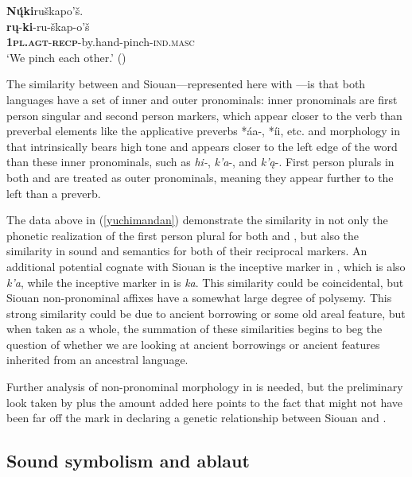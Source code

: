\documentclass[output=paper]{LSP/langsci}
\begin{document}
	\ex  
	\glll \textbf{N\k{\'u}ki}ru\v{s}kapo'\v{s}. \\ 
	\textbf{r\k{u}}-\textbf{ki}-ru-\v{s}kap-o'\v{s}\\
			\textbf{\textsc{1pl.agt}}-\textbf{\textsc{recp}}-by.hand-pinch-\textsc{ind.masc}\\ 
	\glt `We pinch each other.' (\citealt[440]{Hollow1970})
\z
\z

The similarity between  and Siouan---represented here with ---is that both languages have a set of inner and outer pronominals: inner pronominals are first person singular and second person markers, which appear closer to the verb than preverbal elements like the  applicative preverbs *\'aa-, *\'ii, etc. and morphology in  that intrinsically bears high tone and appears closer to the left edge of the word than these inner pronominals, such as \emph{hi-}, \emph{k'a}-, and \emph{k'\k{a}}-. First person plurals in both  and  are treated as outer pronominals, meaning they appear further to the left than a preverb.

The data above in (\ref{yuchimandan}) demonstrate the similarity in not only the phonetic realization of the first person plural for both  and , but also the similarity in sound and semantics for both of their reciprocal markers. An additional potential cognate with Siouan is the inceptive marker in , which is also \emph{k'a}, while the inceptive marker in  is \emph{ka}. This similarity could be coincidental, but Siouan non-pronominal affixes have a somewhat large degree of polysemy.  This strong similarity could be due to ancient borrowing or some old areal feature, but when taken as a whole, the summation of these similarities begins to beg the question of whether we are looking at ancient borrowings or ancient features inherited from an ancestral language. 

Further analysis of non-pronominal morphology in  is needed, but the preliminary look taken by \citet{Rankin1998scy} plus the amount added here points to the fact that \citet{Sapir1929} might not have been far off the mark in declaring a genetic relationship between Siouan and .

\subsection{Sound symbolism and ablaut}
\end{document}
